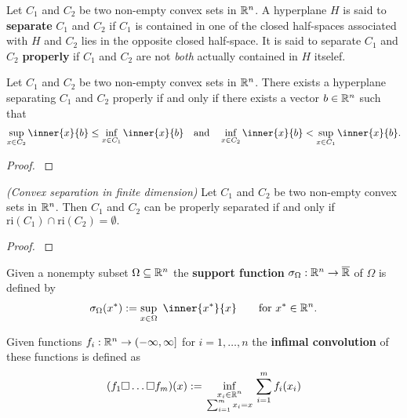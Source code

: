 \begin{definition}
  Let 
  $C_1$ and $C_2$
  be two non-empty convex sets in $\mathbb{R}^n$. 
  A hyperplane $H$ is said to \textbf{separate}
  $C_1$ and $C_2$
  if $C_1$ is contained in one of the closed half-spaces associated with
  $H$ and $C_2$ lies in the opposite closed half-space. It is said to separate 
  $C_1$ and $C_2$
  \textbf{properly} if 
  $C_1$ and $C_2$
  are not \textit{both} actually contained in $H$ itselef.
\end{definition}
\begin{theorem}
  Let $C_1$ and $C_2$ be two non-empty convex sets in $\mathbb{R}^n$. 
  There exists a hyperplane separating
  $C_1$ and $C_2$
  properly 
  if and only if
  there exists a vector $b\in \mathbb{R}^n$ such that
  \begin{gather}
    \sup_{x\in C_2} \inner{x}{b}
    \le
    \inf_{x\in C_1} \inner{x}{b}
    \quad 
    \text{and}
    \quad 
    \inf_{x\in C_2} \inner{x}{b}
    <
    \sup_{x\in C_1} \inner{x}{b}
    .
  \end{gather}
\end{theorem}
\begin{proof}
  \cite[Theorem~11.1]{Rockafellar1970}
\end{proof}
\begin{ftheorem}
  \label{cv:primer:sep}
  \emph{(Convex separation in finite dimension)}
  Let $C_1$ and $C_2$ be two non-empty convex sets in $\mathbb{R}^n$. 
  Then $C_1$ and $C_2$ can be properly separated if and only if 
  $\mathrm{ri}(C_1)\cap\mathrm{ri}(C_2)=\emptyset.$
\end{ftheorem}
\begin{proof}
  \cite[Theorem~11.3]{Rockafellar1970}
\end{proof}




\begin{definition}
  Given a nonempty subset 
  $\Omega \subseteq \mathbb{R}^n$
  the \textbf{support function} 
  $
  \sigma_\Omega : \mathbb{R}^n \to \overline{\mathbb{R}}
  $
  of $\Omega$
  is defined by
  \begin{gather}
    \sigma_\Omega
    (x^*)
    :=
    \sup_{x \in \Omega}
    \ 
    \inner{x^*}{x}
    \qquad
    \text{for}\ 
    x^* \in \R^n
    .
  \end{gather}
\end{definition}


\begin{definition}
  Given functions
  $
    f_i:
    \mathbb{R}^n \to (-\infty, \infty]
  $
  for $ i = 1, \ldots, n $
  the \textbf{infimal convolution} of these functions is defined as
  \begin{gather}
    (f_1 \square \ldots \square f_m)(x)
    :=
    \inf_{
    \begin{smallmatrix}
      x_i \in \mathbb{R}^n \\
      \sum_{i = 1}^{m} 
        x_i
      =
      x
    \end{smallmatrix}
    }
    \sum_{i = 1}^{m}
      f_i(x_i)
  \end{gather}
\end{definition}
 
